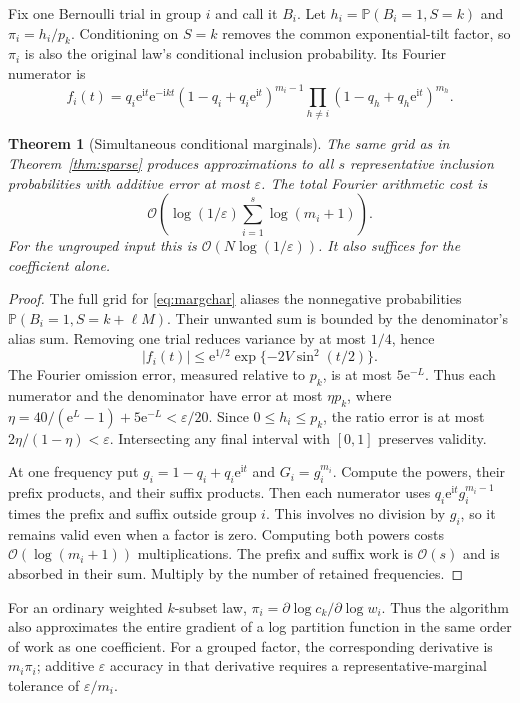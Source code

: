 \documentclass[11pt,a4paper]{article}
\newtheorem{theorem}{Theorem}[section]
\theoremstyle{definition}
\newcommand{\Prob}{\mathbb P}
\newcommand{\ii}{\mathrm i}
\newcommand{\ee}{\mathrm e}
\newcommand{\abs}[1]{\left|#1\right|}
\newcommand{\BigO}{\mathcal O}
\begin{document}
Fix one Bernoulli trial in group $i$ and call it $B_i$. Let
$h_i=\Prob(B_i=1,S=k)$ and $\pi_i=h_i/p_k$.
Conditioning on $S=k$ removes the common exponential-tilt factor, so $\pi_i$ is also the original law's conditional inclusion probability. Its Fourier numerator is
\begin{equation}\label{eq:margchar}
 f_i(t)=q_i\ee^{\ii t}\ee^{-\ii kt}
 (1-q_i+q_i\ee^{\ii t})^{m_i-1}
 \prod_{h\ne i}(1-q_h+q_h\ee^{\ii t})^{m_h}.
\end{equation}

\begin{theorem}[Simultaneous conditional marginals]\label{thm:marginals}
The same grid as in Theorem~\ref{thm:sparse} produces approximations to all $s$ representative inclusion probabilities with additive error at most $\varepsilon$. The total Fourier arithmetic cost is
\begin{equation}\label{eq:fouriercost}
 \BigO\!\left(\log(1/\varepsilon)
 \sum_{i=1}^s\log(m_i+1)\right).
\end{equation}
For the ungrouped input this is $\BigO(N\log(1/\varepsilon))$. It also suffices for the coefficient alone.
\end{theorem}
\begin{proof}
The full grid for \eqref{eq:margchar} aliases the nonnegative probabilities
$\Prob(B_i=1,S=k+\ell M)$. Their unwanted sum is bounded by the denominator's alias sum. Removing one trial reduces variance by at most $1/4$, hence
\[
 \abs{f_i(t)}\le\ee^{1/2}\exp\{-2V\sin^2(t/2)\}.
\]
The Fourier omission error, measured relative to $p_k$, is at most $5\ee^{-L}$. Thus each numerator and the denominator have error at most $\eta p_k$, where
$\eta=40/(\ee^L-1)+5\ee^{-L}<\varepsilon/20$.
Since $0\le h_i\le p_k$, the ratio error is at most
$2\eta/(1-\eta)<\varepsilon$. Intersecting any final interval with $[0,1]$ preserves validity.

At one frequency put $g_i=1-q_i+q_i\ee^{\ii t}$ and $G_i=g_i^{m_i}$. Compute the powers, their prefix products, and their suffix products. Then each numerator uses $q_i\ee^{\ii t}g_i^{m_i-1}$ times the prefix and suffix outside group $i$. This involves no division by $g_i$, so it remains valid even when a factor is zero. Computing both powers costs $\BigO(\log(m_i+1))$ multiplications. The prefix and suffix work is $\BigO(s)$ and is absorbed in their sum. Multiply by the number of retained frequencies.
\end{proof}

For an ordinary weighted $k$-subset law, $\pi_i=\partial\log c_k/\partial\log w_i$. Thus the algorithm also approximates the entire gradient of a log partition function in the same order of work as one coefficient. For a grouped factor, the corresponding derivative is $m_i\pi_i$; additive $\varepsilon$ accuracy in that derivative requires a representative-marginal tolerance of $\varepsilon/m_i$.
\end{document}
